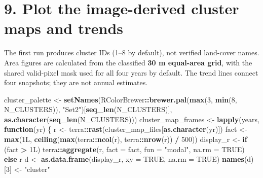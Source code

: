 \documentclass[
]{article}
\newenvironment{Shaded}{\begin{snugshade}}{\end{snugshade}}
\newcommand{\AttributeTok}[1]{\textcolor[rgb]{0.13,0.29,0.53}{#1}}
\newcommand{\ConstantTok}[1]{\textcolor[rgb]{0.56,0.35,0.01}{#1}}
\newcommand{\ControlFlowTok}[1]{\textcolor[rgb]{0.13,0.29,0.53}{\textbf{#1}}}
\newcommand{\DataTypeTok}[1]{\textcolor[rgb]{0.13,0.29,0.53}{#1}}
\newcommand{\DecValTok}[1]{\textcolor[rgb]{0.00,0.00,0.81}{#1}}
\newcommand{\FunctionTok}[1]{\textcolor[rgb]{0.13,0.29,0.53}{\textbf{#1}}}
\newcommand{\NormalTok}[1]{#1}
\newcommand{\OtherTok}[1]{\textcolor[rgb]{0.56,0.35,0.01}{#1}}
\newcommand{\SpecialCharTok}[1]{\textcolor[rgb]{0.81,0.36,0.00}{\textbf{#1}}}
\newcommand{\StringTok}[1]{\textcolor[rgb]{0.31,0.60,0.02}{#1}}
\begin{document}
\section{9. Plot the image-derived cluster maps and
trends}\label{plot-the-image-derived-cluster-maps-and-trends}

The first run produces cluster IDs (1--8 by default), not verified
land-cover names. Area figures are calculated from the classified
\textbf{30 m equal-area grid}, with the shared valid-pixel mask used for
all four years by default. The trend lines connect four snapshots; they
are not annual estimates.

\begin{Shaded}
\begin{Highlighting}[]
\NormalTok{cluster\_palette }\OtherTok{\textless{}{-}} \FunctionTok{setNames}\NormalTok{(RColorBrewer}\SpecialCharTok{::}\FunctionTok{brewer.pal}\NormalTok{(}\FunctionTok{max}\NormalTok{(}\DecValTok{3}\NormalTok{, }\FunctionTok{min}\NormalTok{(}\DecValTok{8}\NormalTok{, N\_CLUSTERS)), }\StringTok{"Set2"}\NormalTok{)[}\FunctionTok{seq\_len}\NormalTok{(N\_CLUSTERS)], }\FunctionTok{as.character}\NormalTok{(}\FunctionTok{seq\_len}\NormalTok{(N\_CLUSTERS)))}
\NormalTok{cluster\_map\_frames }\OtherTok{\textless{}{-}} \FunctionTok{lapply}\NormalTok{(years, }\ControlFlowTok{function}\NormalTok{(yr) \{}
\NormalTok{  r }\OtherTok{\textless{}{-}}\NormalTok{ terra}\SpecialCharTok{::}\FunctionTok{rast}\NormalTok{(cluster\_map\_files[}\FunctionTok{as.character}\NormalTok{(yr)])}
\NormalTok{  fact }\OtherTok{\textless{}{-}} \FunctionTok{max}\NormalTok{(}\DecValTok{1}\DataTypeTok{L}\NormalTok{, }\FunctionTok{ceiling}\NormalTok{(}\FunctionTok{max}\NormalTok{(terra}\SpecialCharTok{::}\FunctionTok{ncol}\NormalTok{(r), terra}\SpecialCharTok{::}\FunctionTok{nrow}\NormalTok{(r)) }\SpecialCharTok{/} \DecValTok{500}\NormalTok{))}
\NormalTok{  display\_r }\OtherTok{\textless{}{-}} \ControlFlowTok{if}\NormalTok{ (fact }\SpecialCharTok{\textgreater{}} \DecValTok{1}\DataTypeTok{L}\NormalTok{) terra}\SpecialCharTok{::}\FunctionTok{aggregate}\NormalTok{(r, }\AttributeTok{fact =}\NormalTok{ fact, }\AttributeTok{fun =} \StringTok{"modal"}\NormalTok{, }\AttributeTok{na.rm =} \ConstantTok{TRUE}\NormalTok{) }\ControlFlowTok{else}\NormalTok{ r}
\NormalTok{  d }\OtherTok{\textless{}{-}} \FunctionTok{as.data.frame}\NormalTok{(display\_r, }\AttributeTok{xy =} \ConstantTok{TRUE}\NormalTok{, }\AttributeTok{na.rm =} \ConstantTok{TRUE}\NormalTok{)}
  \FunctionTok{names}\NormalTok{(d)[}\DecValTok{3}\NormalTok{] }\OtherTok{\textless{}{-}} \StringTok{"cluster"}

\end{Highlighting}
\end{Shaded}
\end{document}
